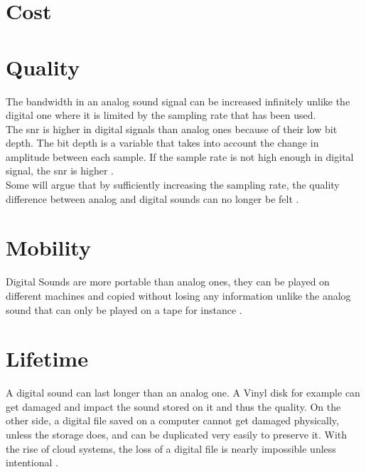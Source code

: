 \section{Cost}


\section{Quality}

The bandwidth in an analog sound signal can be increased infinitely unlike the digital one where it is limited by the sampling rate that has been used. \\
The \gls{snr} is higher in digital signals than analog ones because of their low bit depth. The bit depth is a variable that takes into account the change in amplitude between each sample. If the sample rate is not high enough in digital signal, the \gls{snr} is higher \citep{analog_quality}. \\
Some will argue that by sufficiently increasing the sampling rate, the quality difference between analog and digital sounds can no longer be felt \citep{analog_storage}.

\section{Mobility}

Digital Sounds are more portable than analog ones, they can be played on different machines and copied without losing any information unlike the analog sound that can only be played on a tape for instance \citep{analog_quality}. 

\section{Lifetime}

A digital sound can last longer than an analog one. A Vinyl disk for example can get damaged and impact the sound stored on it and thus the quality. On the other side, a digital file saved on a computer cannot get damaged physically, unless the storage does, and can be duplicated very easily to preserve it. With the rise of cloud systems, the loss of a digital file is nearly impossible unless intentional \citep{analog_storage}. 